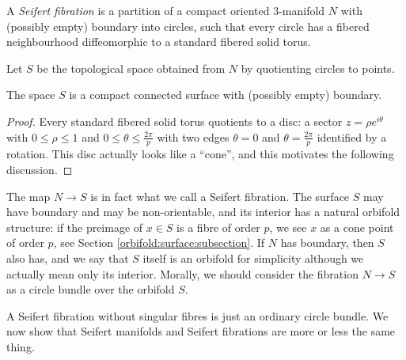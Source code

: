 \begin{defn}
A \emph{Seifert fibration} is a partition of a compact oriented 3-manifold $N$ with (possibly empty) boundary into circles, such that every circle has a fibered neighbourhood diffeomorphic to a standard fibered solid torus.
\end{defn}

Let $S$ be the topological space obtained from $N$ by quotienting circles to points.

\begin{prop}
The space $S$ is a compact connected surface with (possibly empty) boundary.
\end{prop}
\begin{proof}
Every standard fibered solid torus quotients to a disc: a sector $z= \rho e^{i\theta}$ with $0\leqslant \rho \leqslant 1$ and $0\leqslant \theta \leqslant \frac{2\pi}p$ with two edges $\theta=0$ and $\theta = \frac{2\pi}p$ identified by a rotation. This disc actually looks like a ``cone'', and this motivates the following discussion.
\end{proof}

The map $N \to S$ is in fact what we call a Seifert fibration. The surface $S$ may have boundary and may be non-orientable, and its interior has a natural orbifold structure: if the preimage of $x\in S$ is a fibre of order $p$, we see $x$ as a cone point of order $p$, see Section \ref{orbifold:surface:subsection}. If $N$ has boundary, then $S$ also has, and we say that $S$ itself is an orbifold for simplicity although we actually mean only its interior. Morally, we should consider the fibration $N\to S$ as a circle bundle over the orbifold $S$.

A Seifert fibration without singular fibres is just an ordinary circle bundle. 
We now show that Seifert manifolds and Seifert fibrations are more or less the same thing. 

